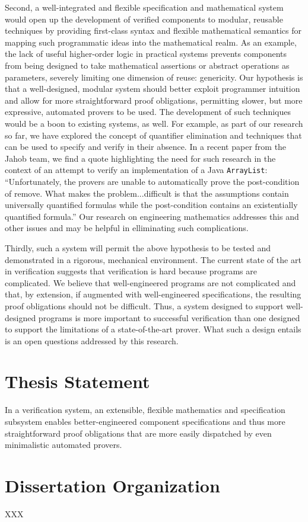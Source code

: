 Second, a well-integrated and flexible specification and mathematical system would open up the development of verified components to modular, reusable techniques by providing first-class syntax and flexible mathematical semantics for mapping such programmatic ideas into the mathematical realm.  As an example, the lack of useful higher-order logic in practical systems prevents components from being designed to take mathematical assertions or abstract operations as parameters, severely limiting one dimension of reuse: genericity\cite{bronishMap}.  Our hypothesis is that a well-designed, modular system should better exploit programmer intuition and allow for more straightforward proof obligations, permitting slower, but more expressive, automated provers to be used.  The development of such techniques would be a boon to existing systems, as well.  For example, as part of our research so far, we have explored the concept of quantifier elimination and techniques that can be used to specify and verify in their absence.  In a recent paper from the Jahob team, we find a quote highlighting the need for such research in the context of an attempt to verify an implementation of a Java \texttt{ArrayList}: ``Unfortunately, the provers are unable to automatically prove the post-condition of remove.  What makes the problem...difficult is that the assumptions contain universally quantified formulas while the post-condition contains an existentially quantified formula.''  Our research on engineering mathematics addresses this and other issues and may be helpful in elliminating such complications.

Thirdly, such a system will permit the above hypothesis to be tested and demonstrated in a rigorous, mechanical environment.  The current state of the art in verification suggests that verification is hard because programs are complicated.  We believe that well-engineered programs are not complicated and that, by extension, if augmented with well-engineered specifications, the resulting proof obligations should not be difficult.  Thus, a system designed to support well-designed programs is more important to successful verification than one designed to support the limitations of a state-of-the-art prover.  What such a design entails is an open questions addressed by this research.

\section{Thesis Statement}
In a verification system, an extensible, flexible mathematics and specification subsystem enables better-engineered component specifications and thus more straightforward proof obligations that are more easily dispatched by even minimalistic automated provers.

\section{Dissertation Organization}
XXX
